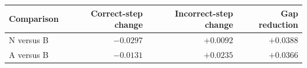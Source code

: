 \begin{tabular}{lrrr}
\toprule
Comparison & Correct-step change & Incorrect-step change & Gap reduction \\
\midrule
N versus B & $-0.0297$ & $+0.0092$ & $+0.0388$ \\
A versus B & $-0.0131$ & $+0.0235$ & $+0.0366$ \\
\bottomrule
\end{tabular}
